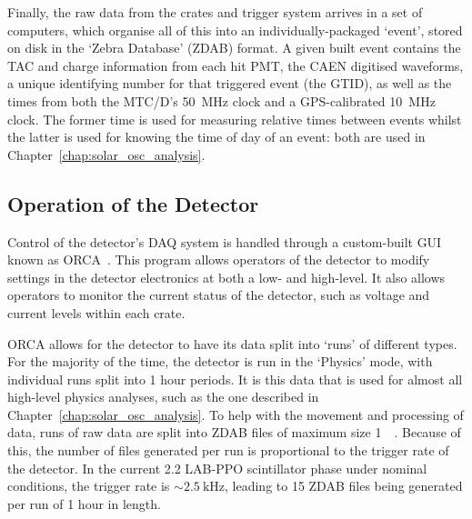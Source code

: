 Finally, the raw data from the crates and trigger system arrives in a set of computers, which organise all of this into an individually-packaged `event', stored on disk in the `Zebra Database' (ZDAB) format. A given built event contains the TAC and charge information from each hit PMT, the CAEN digitised waveforms, a unique identifying number for that triggered event (the GTID), as well as the times from both the MTC/D's \SI{50}{\MHz} clock and a GPS-calibrated \SI{10}{\MHz} clock. The former time is used for measuring relative times between events whilst the latter is used for knowing the time of day of an event: both are used in Chapter~\ref{chap:solar_osc_analysis}.


\subsection{Operation of the Detector}\label{sec:detector_ops}
Control of the detector's DAQ system is handled through a custom-built GUI known as ORCA~\cite{howeSudburyNeutrinoObservatory2004}. %
This program allows operators of the detector to modify settings in the detector electronics at both a low- and high-level. It also allows operators to monitor the current status of the detector, such as voltage and current levels within each crate.

ORCA allows for the detector to have its data split into `runs' of different types. For the majority of the time, the detector is run in the `Physics' mode, with individual runs split into 1 hour periods. It is this data that is used for almost all high-level physics analyses, such as the one described in Chapter~\ref{chap:solar_osc_analysis}. To help with the movement and processing of data, runs of raw data are split into ZDAB files of maximum size \SI{1}{\giga\byte}. Because of this, the number of files generated per run is proportional to the trigger rate of the detector. In the current \SI{2.2}{\gpl} LAB-PPO scintillator phase under nominal conditions, the trigger rate is $\sim\SI{2.5}{\kilo\Hz}$, leading to 15 ZDAB files being generated per run of 1 hour in length.

